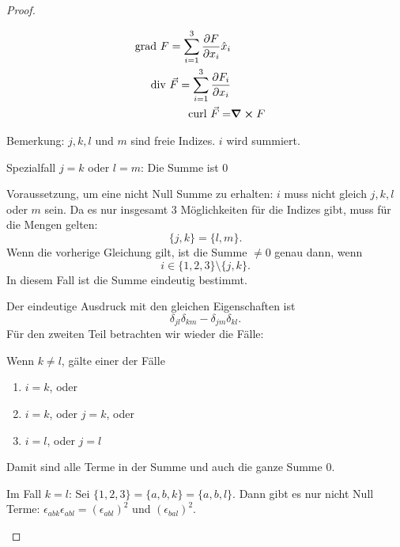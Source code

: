 \begin{proof}
	\begin{parts}
	\item 
		\begin{align*}
			\text{grad }F=\sum_{i=1}^3 \pdv{F}{x_i}\hat{x}_i\\
			\text{div }\vec{F}=\sum_{i=1}^3 \pdv{F_i}{x_i}\\
			\text{curl }\vec{F}=&\curl{F}
		\end{align*}
	\item Bemerkung: $j,k,l$ und $ m$ sind freie Indizes. $i$ wird summiert.

	Spezialfall $j=k$ oder $l=m$: Die Summe ist 0

	Voraussetzung, um eine nicht Null Summe zu erhalten: $i$ muss nicht gleich $j,k,l$ oder $m$ sein. Da es nur insgesamt 3 Möglichkeiten für die Indizes gibt, muss für die Mengen gelten:
	 \[
	\{j,k\} =\{l,m\} 
	.\] 
	Wenn die vorherige Gleichung gilt, ist die Summe $\neq 0$ genau dann, wenn
	\[
	i\in \{1,2,3\} \setminus \{j,k\} 
	.\] 
	In diesem Fall ist die Summe eindeutig bestimmt. 

	Der eindeutige Ausdruck mit den gleichen Eigenschaften ist
	\[
		\delta_{jl}\delta_{km}-\delta_{jm}\delta_{kl}
	.\] 
	Für den zweiten Teil betrachten wir wieder die Fälle:
	
	Wenn $k\neq l$, gälte einer der Fälle
	\begin{enumerate}[label=(\roman*)]
		\item $i=k$, oder
		\item $i=k$, oder $j=k$, oder
		\item $i=l$, oder $j=l$
	\end{enumerate}
	Damit sind alle Terme in der Summe und auch die ganze Summe $0$.

	Im Fall $k=l$: Sei $\{1,2,3\} = \{a,b,k\} =\{a,b,l\} $. Dann gibt es nur nicht Null Terme: $\epsilon_{abk}\epsilon_{abl}=(\epsilon_{abl})^2$ und $(\epsilon_{bal})^2$.


\end{parts}
\end{proof}
